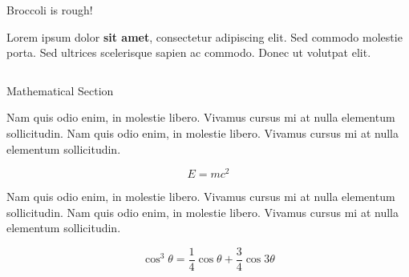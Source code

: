 \documentclass[]{beamer}
\begin{document}
\begin{frame}[t]
\begin{columns}[t]
\begin{column}{\twocolwid}
\begin{columns}[t,totalwidth=\twocolwid]
    \end{columns} %
    
    
    \begin{alertblock}{Broccoli is rough!}
    
    Lorem ipsum dolor \textbf{sit amet}, consectetur adipiscing elit. Sed commodo molestie porta. Sed ultrices scelerisque sapien ac commodo. Donec ut volutpat elit.
    
    \end{alertblock} 
    
    
    \begin{columns}[t,totalwidth=\twocolwid] %
    
    \begin{column}{\onecolwid} %
    
    
    \begin{block}{Mathematical Section}
    
    Nam quis odio enim, in molestie libero. Vivamus cursus mi at nulla elementum sollicitudin. Nam quis odio enim, in molestie libero. Vivamus cursus mi at nulla elementum sollicitudin.
      
    \begin{equation}
    E = mc^{2}
    \label{eqn:Einstein}
    \end{equation}
    
    Nam quis odio enim, in molestie libero. Vivamus cursus mi at nulla elementum sollicitudin. Nam quis odio enim, in molestie libero. Vivamus cursus mi at nulla elementum sollicitudin.
    
    \begin{equation}
    \cos^3 \theta =\frac{1}{4}\cos\theta+\frac{3}{4}\cos 3\theta
    \label{eq:refname}
    \end{equation}    
    \end{block}
    

\end{column}
\end{columns}
\end{column}
\end{columns}
\end{frame}
\end{document}
